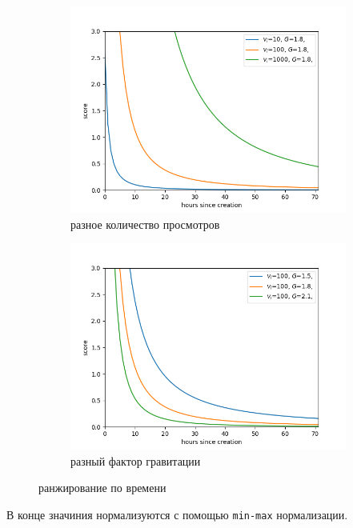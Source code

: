 \documentclass[14pt]{matmex-diploma-custom}
\begin{document}
\begin{figure}[h]
  \begin{subfigure}[b]{0.5\textwidth}
    \includegraphics[width=\textwidth]{images/time_ranking_1.png}
    \caption{разное количество просмотров}
  \end{subfigure}
  \hfill
  \begin{subfigure}[b]{0.5\textwidth}
    \includegraphics[width=\textwidth]{images/time_ranking_2.png}
    \caption{разный фактор гравитации}
  \end{subfigure}
\caption{ранжирование по времени}
    \label{fig:samples}
\end{figure}


В конце значиния нормализуются с помощью \texttt{min-max} нормализации.
\end{document}
